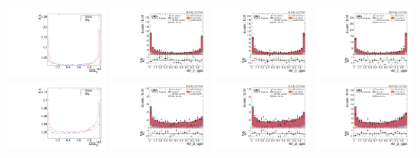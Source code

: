 \begin{figure}[!ht]
  \includegraphics[width=0.23\textwidth]{analysis_plots/tmva_plots/zv_BDTG14_vbf1_AK4_qgid.pdf}
  \includegraphics[width=0.23\textwidth]{analysis_plots/2016_zv/cr_vjets_l/vbf_j1_qgid.pdf}
  \includegraphics[width=0.23\textwidth]{analysis_plots/2017_zv/cr_vjets_l/vbf_j1_qgid.pdf}
  \includegraphics[width=0.23\textwidth]{analysis_plots/2018_zv/cr_vjets_l/vbf_j1_qgid.pdf}\\
  \includegraphics[width=0.23\textwidth]{analysis_plots/tmva_plots/zv_BDTG14_vbf2_AK4_qgid.pdf}
  \includegraphics[width=0.23\textwidth]{analysis_plots/2016_zv/cr_vjets_l/vbf_j2_qgid.pdf}
  \includegraphics[width=0.23\textwidth]{analysis_plots/2017_zv/cr_vjets_l/vbf_j2_qgid.pdf}
  \includegraphics[width=0.23\textwidth]{analysis_plots/2018_zv/cr_vjets_l/vbf_j2_qgid.pdf}\\

\end{figure}
